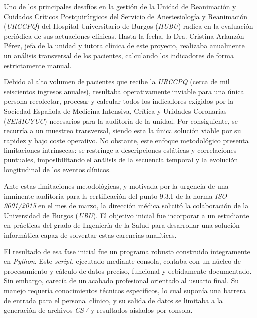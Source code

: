 
Uno de los principales desafíos en la gestión de la Unidad de Reanimación y Cuidados Críticos Postquirúrgicos del Servicio de Anestesiología y Reanimación (\textit{URCCPQ}) del Hospital Universitario de Burgos (\textit{HUBU}) radica en la evaluación periódica de sus actuaciones clínicas. Hasta la fecha, la Dra. Cristina Arlanzón Pérez, jefa de la unidad y tutora clínica de este proyecto, realizaba anualmente un análisis transversal de los pacientes, calculando los indicadores de forma estrictamente manual.

Debido al alto volumen de pacientes que recibe la \textit{URCCPQ} (cerca de mil seiscientos ingresos anuales), resultaba operativamente inviable para una única persona recolectar, procesar y calcular todos los indicadores exigidos por la Sociedad Española de Medicina Intensiva, Crítica y Unidades Coronarias (\textit{SEMICYUC}) \cite{semicyuc} necesarios para la auditoría de la unidad. Por consiguiente, se recurría a un muestreo transversal, siendo esta la única solución viable por su rapidez y bajo coste operativo. No obstante, este enfoque metodológico presenta limitaciones intrínsecas: se restringe a descripciones estáticas y correlaciones puntuales, imposibilitando el análisis de la secuencia temporal y la evolución longitudinal de los eventos clínicos.

Ante estas limitaciones metodológicas, y motivada por la urgencia de una inminente auditoría para la certificación del punto 9.3.1 de la norma \textit{ISO 9001/2015} \cite{iso} en el mes de marzo, la dirección médica solicitó la colaboración de la Universidad de Burgos (\textit{UBU}). El objetivo inicial fue incorporar a un estudiante en prácticas del grado de Ingeniería de la Salud para desarrollar una solución informática capaz de solventar estas carencias analíticas.

El resultado de esa fase inicial fue un programa robusto construido íntegramente en \textit{Python}. Este \textit{script}, ejecutado mediante consola, contaba con un núcleo de procesamiento y cálculo de datos preciso, funcional y debidamente documentado. Sin embargo, carecía de un acabado profesional orientado al usuario final. Su manejo requería conocimientos técnicos específicos, lo cual suponía una barrera de entrada para el personal clínico, y su salida de datos se limitaba a la generación de archivos \textit{CSV} y resultados aislados por consola.

